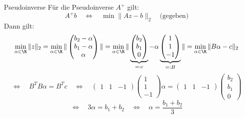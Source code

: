 \begin{example}{Pseudoinverse}
    Für die Pseudoinverse $A^+$ gilt:
    \[
        A^+b \quad \iff \quad \min \|Az - b\|_2 \quad \text{(gegeben)}
    \]
    Dann gilt:
    \[
        \min_{\alpha \in \R} \|z\|_2 = \min_{\alpha \in \R}
        \|
        \begin{pmatrix}
            b_2 - \alpha \\
            b_1 - \alpha \\
            \alpha
        \end{pmatrix}
        \|
        = \min_{\alpha \in \R}
        \|
        \underbrace{\begin{pmatrix}
                b_2 \\
                b_1 \\
                0
            \end{pmatrix}}_{=: c}
        - \alpha
        \underbrace{
            \begin{pmatrix}
                1 \\
                1 \\
                -1
            \end{pmatrix}}_{=: B}
        \|
        = \min_{\alpha \in \R} \| B \alpha - c \|_2
    \]
    \[
        \iff \quad B^TB\alpha = B^Tc \quad \iff \quad
        \begin{pmatrix}
            1 & 1 & -1
        \end{pmatrix}
        \begin{pmatrix}
            1 \\ 1 \\ -1
        \end{pmatrix}
        \alpha
        =
        \begin{pmatrix}
            1 & 1 & -1
        \end{pmatrix}
        \begin{pmatrix}
            b_2 \\ b_1 \\ 0
        \end{pmatrix}
    \]
    \[
        \iff \quad 3\alpha = b_1 + b_2 \quad \iff \quad \alpha = \frac{b_1 + b_2}{3}
    \]


\end{example}
